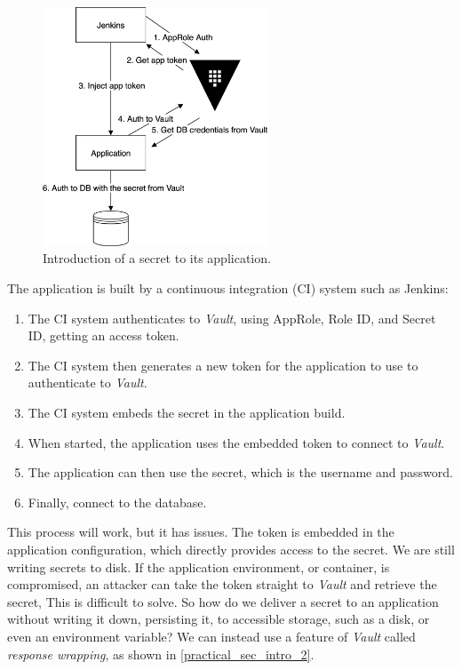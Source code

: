 \documentclass[runningheads]{llncs}
\begin{document}
\begin{figure}
    \centering
    \includegraphics[width=0.6\textwidth]{images/nsip_practical_sec_intro_1.png}
    \caption{Introduction of a secret to its application.}
    \label{practical_sec_intro_1}
\end{figure}

The application is built by a continuous integration (CI) system such as Jenkins: 

\begin{enumerate}
    \setlength\itemsep{1mm}
    \item The CI system authenticates to \textit{Vault}, using AppRole, Role ID, and Secret ID, getting an access token. 
    \item The CI system then generates a new token for the application to use to authenticate to \textit{Vault}. 
    \item The CI system embeds the secret in the application build.
    \item When started, the application uses the embedded token to connect to \textit{Vault}. 
    \item The application can then use the secret, which is the username and password.
    \item Finally, connect to the database.
\end{enumerate}

This process will work, but it has issues. The token is embedded in the application configuration, which directly provides access to the secret. We are  still writing secrets to disk. If the application environment, or container, is compromised, an attacker can take the token straight to \textit{Vault} and retrieve the secret, This is difficult to solve. So how do we deliver a secret to an application without writing it down, persisting it, to accessible storage, such as a disk, or even an environment variable? We can instead use a feature of \textit{Vault} called \textit{response wrapping}, as shown in \autoref{practical_sec_intro_2}.
\end{document}
